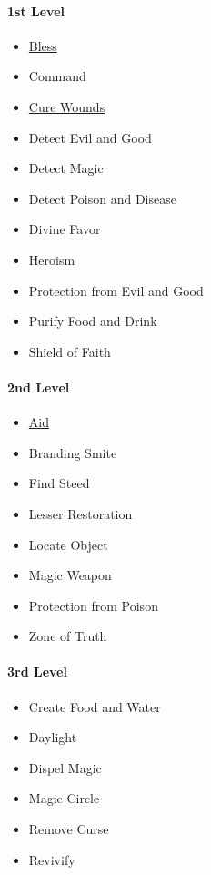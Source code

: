 \paragraph{1st Level}\label{_1st_level_2}

\begin{itemize}
\item
  \hyperref[spell-bless]{Bless}
\item
  Command
\item
  \hyperref[spell-cure-wounds]{Cure Wounds}
\item
  Detect Evil and Good
\item
  Detect Magic
\item
  Detect Poison and Disease
\item
  Divine Favor
\item
  Heroism
\item
  Protection from Evil and Good
\item
  Purify Food and Drink
\item
  Shield of Faith
\end{itemize}

\paragraph{2nd Level}\label{_2nd_level_2}

\begin{itemize}
\item
  \hyperref[spell-aid]{Aid}
\item
  Branding Smite
\item
  Find Steed
\item
  Lesser Restoration
\item
  Locate Object
\item
  Magic Weapon
\item
  Protection from Poison
\item
  Zone of Truth
\end{itemize}

\paragraph{3rd Level}\label{_3rd_level_2}

\begin{itemize}
\item
  Create Food and Water
\item
  Daylight
\item
  Dispel Magic
\item
  Magic Circle
\item
  Remove Curse
\item
  Revivify
\end{itemize}


